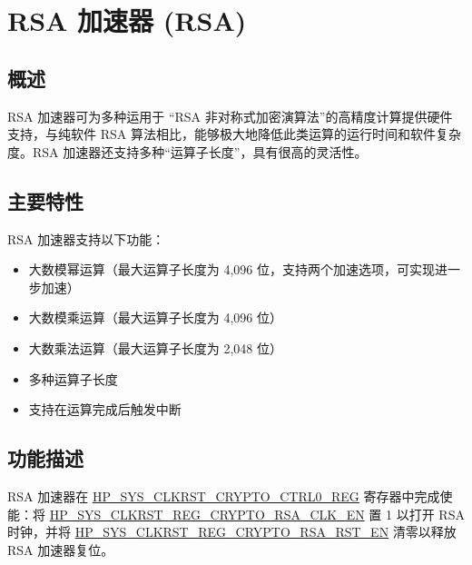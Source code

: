 \documentclass[main\_\_CN.tex]{subfiles}
\begin{document}
\setchineseformatting


\ifglobal
\else
    \clearpage
    \listoftodos
    \listofdonetodos
    \tableofcontents
\fi



\hypertarget{rsa}{}
\chapter{RSA 加速器 (RSA)}\label{mod:rsa}

\section{概述}

RSA 加速器可为多种运用于 “RSA 非对称式加密演算法”的高精度计算提供硬件支持，与纯软件 RSA 算法相比，能够极大地降低此类运算的运行时间和软件复杂度。RSA 加速器还支持多种“运算子长度”，具有很高的灵活性。

\section{主要特性}

RSA 加速器支持以下功能：
\begin{itemize}
    \item 大数模幂运算（最大运算子长度为 4,096 位，支持两个加速选项，可实现进一步加速）
    \item 大数模乘运算（最大运算子长度为 4,096 位）
    \item 大数乘法运算（最大运算子长度为 2,048 位）
    \item 多种运算子长度
    \item 支持在运算完成后触发中断
\end{itemize}

\section{功能描述}\label{sec:rsa-func-desc}

RSA 加速器在 \hyperref[regdesc:HPSYSCLKRSTCRYPTOCTRL0REG]{HP\_SYS\_CLKRST\_CRYPTO\_CTRL0\_REG} 寄存器中完成使能：将 \hyperref[fielddesc:HPSYSCLKRSTREGCRYPTORSACLKEN]{HP\_SYS\_CLKRST\_REG\_CRYPTO\_RSA\_CLK\_EN} 置 1 以打开 RSA 时钟，并将 \hyperref[fielddesc:HPSYSCLKRSTREGCRYPTORSARSTEN]{HP\_SYS\_CLKRST\_REG\_CRYPTO\_RSA\_RST\_EN} 清零以释放 RSA 加速器复位。
\end{document}
